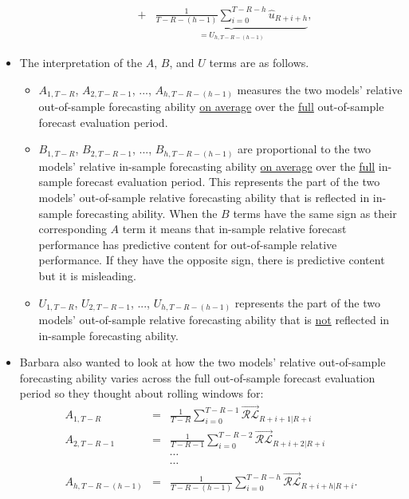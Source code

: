 \documentclass[11pt]{article}
\begin{document}
\begin{itemize}
\begin{itemize}
\begin{eqnarray}
\nonumber \\
\!\!\!\!&+&\!\!\!\!
\underbrace{\frac{1}{T\!-\!R\!-\!(h\!-\!1)}\!\!\!\!\sum_{i=0}^{T-R-h}\!\!\!\!\widehat{u}_{R+i+h}}_{=U_{h,T-R-(h-1)}}, \nonumber
\end{eqnarray}
\end{itemize}
\item The interpretation of the $A$, $B$, and $U$ terms are as follows.
\begin{itemize}
\item $A_{1,T\!-\!R}$, $A_{2,T\!-\!R\!-\!1}$, ..., $A_{h,T\!-\!R\!-\!\!(h\!-\!1)}$ measures the two models' relative out-of-sample forecasting ability \underline{on average} over the \underline{full} out-of-sample forecast evaluation period.
\item $B_{1,T\!-\!R}$, $B_{2,T\!-\!R\!-\!1}$, ..., $B_{h,T\!-\!R\!-\!\!(h\!-\!1)}$ are proportional to the two models' relative in-sample forecasting ability \underline{on average} over the \underline{full} in-sample forecast evaluation period.  This represents the part of the two models' out-of-sample relative forecasting ability that is reflected in in-sample forecasting ability.  When the $B$ terms have the same sign as their corresponding $A$ term it means that in-sample relative forecast performance has predictive content for out-of-sample relative performance.  If they have the opposite sign, there is predictive content but it is misleading.
\item $U_{1,T\!-\!R}$, $U_{2,T\!-\!R\!-\!1}$, ..., $U_{h,T\!-\!R\!-\!\!(h\!-\!1)}$ represents the part of the two models' out-of-sample relative forecasting ability that is \underline{not} reflected in in-sample forecasting ability. 
\end{itemize}
\item Barbara also wanted to look at how the two models' relative out-of-sample forecasting ability varies across the full out-of-sample forecast evaluation period so they thought about rolling windows for:
\begin{eqnarray}
A_{1,T\!-\!R}\!\!\!\!&=&\!\!\!\!\frac{1}{T\!-\!R}\!\!\sum_{i=0}^{T-R-1}\!\!\overrightarrow{\mathcal{RL}}_{R+i+1|R+i} \nonumber \\
A_{2,T\!-\!R\!-\!1}\!\!\!\!&=&\!\!\!\!\frac{1}{T\!-\!R\!-\!1}\!\!\sum_{i=0}^{T-R-2}\!\!\overrightarrow{\mathcal{RL}}_{R+i+2|R+i} \nonumber \\
\!\!\!\!&&\!\!\!\!\cdots  \nonumber \\
\!\!\!\!&&\!\!\!\!\cdots  \nonumber \\
A_{h,T\!-\!R\!-\!\!(h\!-\!1)}\!\!\!\!&=&\!\!\!\!\frac{1}{T\!-\!R\!-\!(h\!-\!1)}\!\!\sum_{i=0}^{T-R-h}\!\!\overrightarrow{\mathcal{RL}}_{R+i+h|R+i}. \nonumber

\end{eqnarray}
\end{itemize}
\end{document}
